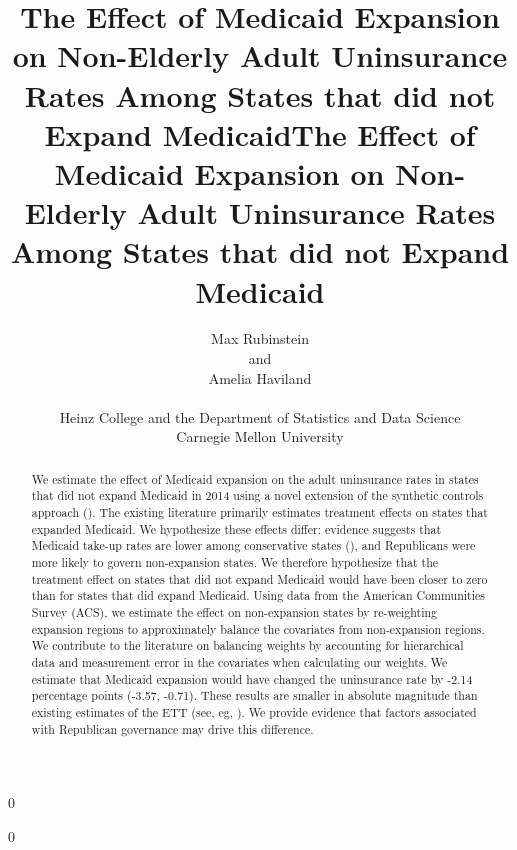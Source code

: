 \documentclass[12pt]{article}
\newcommand{\blind}{0}
\begin{document}
\blind
{
  \title{\bf The Effect of Medicaid Expansion on Non-Elderly Adult Uninsurance Rates Among States that did not Expand Medicaid}
  \author{Max Rubinstein \hspace{.2cm}\\
    and \\
    Amelia Haviland \\ \\
    Heinz College and the Department of Statistics and Data Science \\ Carnegie Mellon University}
  \maketitle
} \fi

\blind
{
  \bigskip
  \bigskip
  \bigskip
  \begin{center}
  \title{\bf The Effect of Medicaid Expansion on Non-Elderly Adult Uninsurance Rates Among States that did not Expand Medicaid}
\end{center}
  \medskip
} \fi

\bigskip

\begin{abstract}

We estimate the effect of Medicaid expansion on the adult uninsurance rates in states that did not expand Medicaid in 2014 using a novel extension of the synthetic controls approach (\cite{abadie2010synthetic}). The existing literature primarily estimates treatment effects on states that expanded Medicaid. We hypothesize these effects differ: evidence suggests that Medicaid take-up rates are lower among conservative states (\cite{sommers2012understanding}), and Republicans were more likely to govern non-expansion states. We therefore hypothesize that the treatment effect on states that did not expand Medicaid would have been closer to zero than for states that did expand Medicaid. Using data from the American Communities Survey (ACS), we estimate the effect on non-expansion states by re-weighting expansion regions to approximately balance the covariates from non-expansion regions. We contribute to the literature on balancing weights by accounting for hierarchical data and measurement error in the covariates when calculating our weights. We estimate that Medicaid expansion would have changed the uninsurance rate by -2.14 percentage points (-3.57, -0.71). These results are smaller in absolute magnitude than existing estimates of the ETT (see, eg, \cite{courtemanche2017early}). We provide evidence that factors associated with Republican governance may drive this difference.

\end{abstract}
\end{document}
